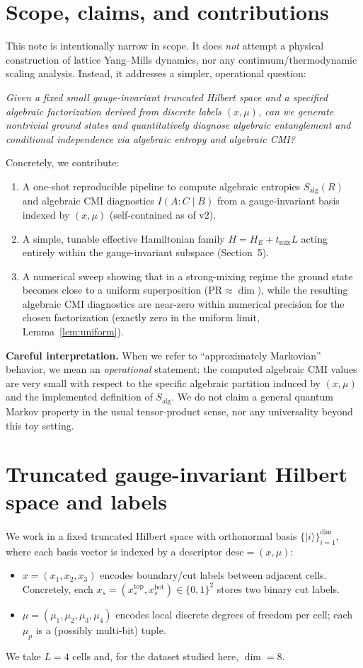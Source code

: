 \documentclass[11pt]{article}
\theoremstyle{remark}
\newcommand{\Salg}{S_{\mathrm{alg}}}
\begin{document}
\section{Scope, claims, and contributions}

This note is intentionally narrow in scope. It does \emph{not} attempt a
physical construction of lattice Yang--Mills dynamics, nor any
continuum/thermodynamic scaling analysis. Instead, it addresses a
simpler, operational question:

\emph{Given a fixed small gauge-invariant truncated Hilbert space and a
specified algebraic factorization derived from discrete labels $(x,
\mu)$, can we generate nontrivial ground states and quantitatively
diagnose algebraic entanglement and conditional independence via
algebraic entropy and algebraic CMI?}

Concretely, we contribute:
\begin{enumerate}
\item A one-shot reproducible pipeline to compute algebraic entropies
$\Salg(R)$ and algebraic CMI diagnostics $I(A : C \mid B)$ from a
gauge-invariant basis indexed by $(x, \mu)$ (self-contained as of v2).
\item A simple, tunable effective Hamiltonian family $H = H_E +
t_{\mathrm{mix}} L$ acting entirely within the gauge-invariant subspace
(Section~5).
\item A numerical sweep showing that in a strong-mixing regime the
ground state becomes close to a uniform superposition ($\mathrm{PR}
\approx \dim$), while the resulting algebraic CMI diagnostics are
near-zero within numerical precision for the chosen factorization
(exactly zero in the uniform limit, Lemma~\ref{lem:uniform}).
\end{enumerate}

\textbf{Careful interpretation.} When we refer to ``approximately
Markovian'' behavior, we mean an \emph{operational} statement: the
computed algebraic CMI values are very small with respect to the
specific algebraic partition induced by $(x, \mu)$ and the implemented
definition of $\Salg$. We do not claim a general quantum Markov property
in the usual tensor-product sense, nor any universality beyond this toy
setting.

\section{Truncated gauge-invariant Hilbert space and labels}

We work in a fixed truncated Hilbert space with orthonormal basis
$\{|i\rangle\}_{i=1}^{\dim}$, where each basis vector is indexed by a
descriptor $\mathrm{desc} = (x, \mu)$:
\begin{itemize}
\item $x = (x_1, x_2, x_3)$ encodes boundary/cut labels between adjacent
cells. Concretely, each $x_s = (x_s^{\mathrm{top}}, x_s^{\mathrm{bot}})
\in \{0, 1\}^2$ stores two binary cut labels.
\item $\mu = (\mu_1, \mu_2, \mu_3, \mu_4)$ encodes local discrete
degrees of freedom per cell; each $\mu_p$ is a (possibly multi-bit)
tuple.
\end{itemize}
We take $L = 4$ cells and, for the dataset studied here, $\dim = 8$.
\end{document}
